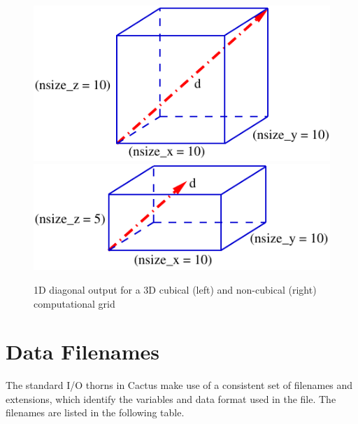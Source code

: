 \documentclass{article}
\begin{document}
\begin{figure}[ht]
\begin{center}
\includegraphics{diagonal_in_cubic}
\includegraphics{diagonal_in_noncubic}
\end{center}
\caption{1D diagonal output for a 3D cubical (left) and non-cubical (right)
computational grid}
\label{default_diagonal_output}
\end{figure}


\section{Data Filenames}

The standard I/O thorns in Cactus make use of a consistent set of filenames
and extensions, which identify the variables and data format used in the file.
The filenames are listed in the following table.
\end{document}
